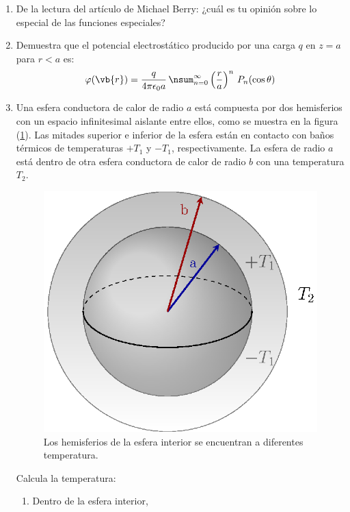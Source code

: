 \begin{enumerate}
\item De la lectura del artículo de Michael Berry: ¿cuál es tu opinión sobre lo especial de las funciones especiales?
\item Demuestra que el potencial electrostático producido por una carga $q$ en $z = a$ para $r < a$ es:
\begin{align*}
\varphi(\vb{r}) = \dfrac{q}{4 \pi \epsilon_{0} a} \, \nsum_{n=0}^{\infty} \left( \dfrac{r}{a} \right)^{n} \, P_{n}(\cos \theta)
\end{align*}
\item Una esfera conductora de calor de radio $a$ está compuesta por dos hemisferios con un espacio infinitesimal aislante entre ellos, como se muestra en la figura (\ref{fig:figura2}). Las mitades superior e inferior de la esfera están en contacto con baños térmicos de temperaturas $+ T_{1}$ y $-T_{1}$, respectivamente. La esfera de radio $a$ está dentro de otra esfera conductora de calor de radio $b$ con una temperatura $T_{2}$.
\begin{figure}[H]
    \centering
   \includegraphics[scale=0.9]{Imagenes/esfera1.eps}
    \caption{Los hemisferios de la esfera interior se encuentran a diferentes temperatura.}
    \label{fig:figura2}
\end{figure}
Calcula la temperatura:
\begin{enumerate}[label=\roman*)]
\item Dentro de la esfera interior,

\end{enumerate}
\end{enumerate}
